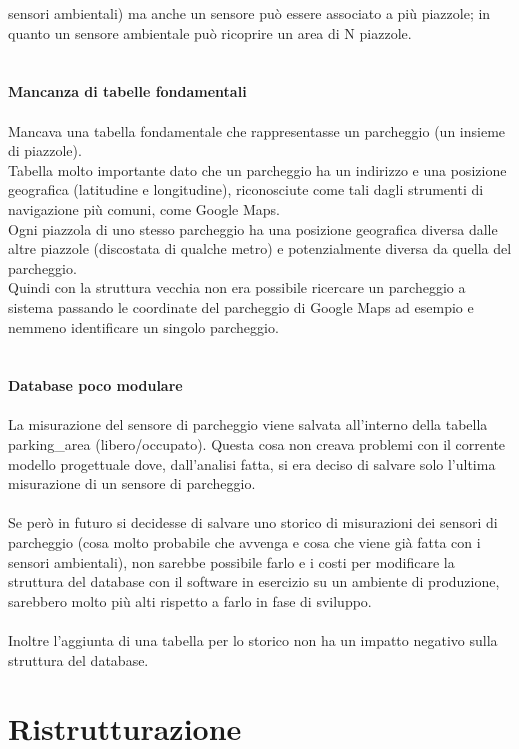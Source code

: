 sensori ambientali) ma anche un sensore può essere associato a più piazzole; in quanto un sensore ambientale
può ricoprire un area di N piazzole.
\\\\\\
\textbf{Mancanza di tabelle fondamentali}
\\\\
Mancava una tabella fondamentale che rappresentasse un parcheggio (un insieme di piazzole). 
\\
Tabella molto importante dato che un parcheggio ha un indirizzo e una posizione geografica (latitudine e longitudine), 
riconosciute come tali dagli strumenti di navigazione più comuni, come Google Maps. 
\\
Ogni piazzola di uno stesso parcheggio ha una posizione geografica diversa dalle altre piazzole (discostata di qualche 
metro) e potenzialmente diversa da quella del parcheggio. 
\\
Quindi con la struttura vecchia non era possibile ricercare un parcheggio a sistema passando le coordinate del parcheggio di Google
Maps ad esempio e nemmeno identificare un singolo parcheggio.
\\\\\\
\textbf{Database poco modulare}
\\\\
La misurazione del sensore di parcheggio viene salvata all'interno della tabella parking\_area (libero/occupato). Questa cosa non creava problemi con il corrente modello progettuale dove,
dall'analisi fatta, si era deciso di salvare solo l'ultima misurazione di un sensore di parcheggio.
\\\\
Se però in futuro si decidesse di salvare uno storico di misurazioni dei sensori di parcheggio (cosa molto probabile che
avvenga e cosa che viene già fatta con i sensori ambientali), non sarebbe possibile farlo e i costi
per modificare la struttura del database con il software in esercizio su un ambiente di produzione, sarebbero molto più
alti rispetto a farlo in fase di sviluppo.
\\\\
Inoltre l'aggiunta di una tabella per lo storico non ha un impatto negativo sulla struttura del database.
\clearpage
\section{Ristrutturazione}

